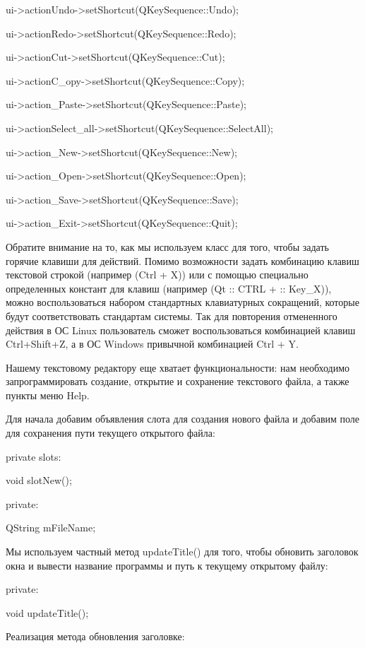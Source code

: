  ui-{>}actionUndo-{>}setShortcut(QKeySequence::Undo);

 ui-{>}actionRedo-{>}setShortcut(QKeySequence::Redo);

 ui-{>}actionCut-{>}setShortcut(QKeySequence::Cut);

 ui-{>}actionC\_opy-{>}setShortcut(QKeySequence::Copy);

 ui-{>}action\_Paste-{>}setShortcut(QKeySequence::Paste);

 ui-{>}actionSelect\_all-{>}setShortcut(QKeySequence::SelectAll);

 ui-{>}action\_New-{>}setShortcut(QKeySequence::New);

 ui-{>}action\_Open-{>}setShortcut(QKeySequence::Open);

 ui-{>}action\_Save-{>}setShortcut(QKeySequence::Save);

 ui-{>}action\_Exit-{>}setShortcut(QKeySequence::Quit);

Обратите внимание на то, как мы используем класс   для того, чтобы задать
горячие клавиши для действий. Помимо возможности задать комбинацию клавиш текстовой строкой (например 
(Ctrl + X)) или с помощью специально определенных констант для клавиш (например  (Qt ::
CTRL +  :: Key\_X)), можно воспользоваться набором стандартных клавиатурных сокращений, которые будут соответствовать
стандартам системы. Так для повторения отмененного действия в ОС Linux пользователь сможет воспользоваться комбинацией
клавиш Ctrl+Shift+Z, а в ОС Windows привычной комбинацией Ctrl + Y. 

Нашему текстовому редактору еще хватает функциональности: нам необходимо запрограммировать создание, открытие и
сохранение текстового файла, а также пункты меню Help.

Для начала добавим объявления слота для создания нового файла и добавим поле для сохранения пути текущего открытого
файла: 

private slots:

 void slotNew();

private:

 QString mFileName;

Мы используем частный метод updateTitle() для того, чтобы обновить заголовок окна и вывести название программы и путь к
текущему открытому файлу: 

private:

 void updateTitle();

Реализация метода обновления заголовке: 

